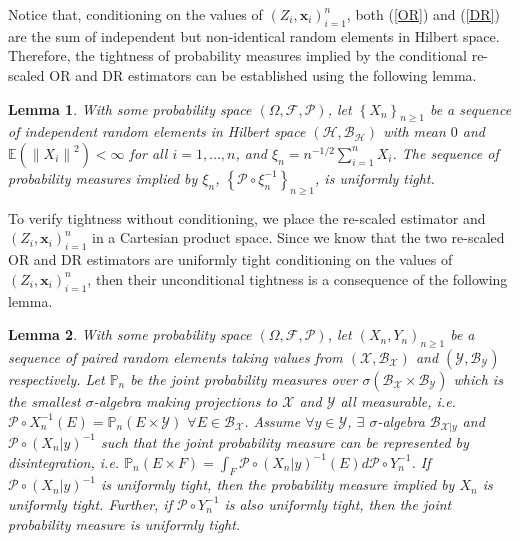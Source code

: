 \documentclass[12pt, A4]{article}
\newtheorem{lemma}{Lemma}
\newcommand{\SumOverN}{\sum_{i=1}^n}
\newcommand{\Norm}[1]{ \left\| #1 \right\| }
\newcommand{\Parentheses}[1]{ \left( #1 \right) }
\newcommand{\Curlybracket}[1]{ \left\{ #1 \right\} }
\begin{document}
        Notice that, conditioning on the values of $\Parentheses{Z_i, \textbf{x}_i}_{i = 1}^n$, both (\ref{OR}) and (\ref{DR}) are the sum of independent but non-identical random elements in Hilbert space. 
        Therefore, the tightness of probability measures implied by the conditional re-scaled OR and DR estimators can be established using the following lemma.\\
        \begin{lemma}\label{lemma:LimRandomElements}
            With some probability space $\Parentheses{\Omega, \mathcal{F}, \mathcal{P}}$, let $\Curlybracket{X_n}_{n \geq 1}$ be a sequence of independent random elements in Hilbert space $\Parentheses{\mathcal{H}, \mathcal{B}_{\mathcal{H}}}$ with mean $0$ and $\mathbb{E}\Parentheses{\Norm{X_i}^2} < \infty$ for all $i=1,\dots, n$, and $\xi_n = n^{-1/2}\SumOverN X_i$. The sequence of probability measures implied by $\xi_n$, $\Curlybracket{\mathcal{P}\circ \xi_n^{-1}}_{n\geq1}$, is uniformly tight.  
        \end{lemma}
        To verify tightness without conditioning, we place the re-scaled estimator and $\Parentheses{Z_i, \textbf{x}_i}_{i=1}^n$ in a Cartesian product space. Since we know that the two re-scaled OR and DR estimators are uniformly tight conditioning on the values of $\Parentheses{Z_i, \textbf{x}_i}_{i=1}^n$, then their unconditional tightness is a consequence of the following lemma.
    \begin{lemma}\label{lemma:joint}     
        With some probability space $\Parentheses{\Omega, \mathcal{F}, \mathcal{P}}$, let $\Parentheses{X_n, Y_n}_{n\geq1}$ be a sequence of paired random elements taking values from $\Parentheses{\mathcal{X}, \mathcal{B}_{\mathcal{X}}}$ and $\Parentheses{\mathcal{Y}, \mathcal{B}_{\mathcal{Y}}}$ respectively. 
        Let $\mathbb{P}_n$ be the joint probability measures over $\sigma\Parentheses{\mathcal{B}_{\mathcal{X}} \times \mathcal{B}_{\mathcal{Y}}}$ which is the smallest $\sigma$-algebra making projections to $\mathcal{X}$ and $\mathcal{Y}$ all measurable, i.e. $\mathcal{P}\circ X_n^{-1} \Parentheses{E} = \mathbb{P}_n(E \times \mathcal{Y})$ $\forall E \in \mathcal{B}_{\mathcal{X}}$.
        Assume $\forall y \in \mathcal{Y}$, $\exists$ $\sigma$-algebra $\mathcal{B}_{\mathcal{X}|y}$ and $\mathcal{P} \circ \Parentheses{X_n | y}^{-1}$ such that the joint probability measure can be represented by disintegration, i.e.
        $\mathbb{P}_n \Parentheses{E \times F} = \int_{F} \mathcal{P}\circ\Parentheses{X_n|y}^{-1}(E) d \mathcal{P}\circ Y_n^{-1}$. 
        If $\mathcal{P}\circ \Parentheses{X_n | y}^{-1}$ is uniformly tight, then the probability measure implied by $X_n$ is uniformly tight. Further, if $\mathcal{P}\circ Y_n^{-1}$ is also uniformly tight, then the joint probability measure is uniformly tight. 
    \end{lemma}
        
\end{document}
